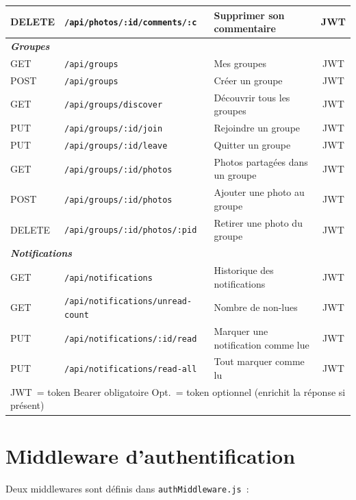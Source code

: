 \documentclass[12pt, a4paper, openany]{report}
\begin{document}
\begin{table}[H]
\begin{tabularx}{\textwidth}{llXc}
DELETE & \texttt{/api/photos/:id/comments/:c} & Supprimer son commentaire             & JWT \\
\midrule
\multicolumn{4}{l}{\small\textit{\textbf{Groupes}}} \\
GET    & \texttt{/api/groups}                    & Mes groupes                        & JWT \\
POST   & \texttt{/api/groups}                    & Créer un groupe                    & JWT \\
GET    & \texttt{/api/groups/discover}           & Découvrir tous les groupes         & JWT \\
PUT    & \texttt{/api/groups/:id/join}           & Rejoindre un groupe                & JWT \\
PUT    & \texttt{/api/groups/:id/leave}          & Quitter un groupe                  & JWT \\
GET    & \texttt{/api/groups/:id/photos}         & Photos partagées dans un groupe    & JWT \\
POST   & \texttt{/api/groups/:id/photos}         & Ajouter une photo au groupe        & JWT \\
DELETE & \texttt{/api/groups/:id/photos/:pid}    & Retirer une photo du groupe        & JWT \\
\midrule
\multicolumn{4}{l}{\small\textit{\textbf{Notifications}}} \\
GET    & \texttt{/api/notifications}              & Historique des notifications      & JWT \\
GET    & \texttt{/api/notifications/unread-count} & Nombre de non-lues                & JWT \\
PUT    & \texttt{/api/notifications/:id/read}     & Marquer une notification comme lue & JWT \\
PUT    & \texttt{/api/notifications/read-all}     & Tout marquer comme lu             & JWT \\
\bottomrule
\multicolumn{4}{l}{\footnotesize JWT~= token Bearer obligatoire \quad Opt.~= token optionnel (enrichit la réponse si présent)}
\end{tabularx}
\end{table}

\section{Middleware d'authentification}

Deux middlewares sont définis dans \texttt{authMiddleware.js}~:
\end{document}
